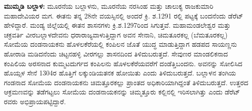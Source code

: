 \textbf{ ಮುಮ್ಮಡಿ ಬಲ್ಲಾಳ: } ಮೂರನೆಯ ಬಲ್ಲಾಳನು, ಮೂರನೆಯ ನರಸಿಂಹ ಮತ್ತು ಚಾಲುಕ್ಯ ರಾಜಕುಮಾರಿ ಮಹಾದೇವಿಯರ ಮಗ. ಈತನು ತನ್ನ 28ನೇ ವಯಸ್ಸಿನಲ್ಲಿ ಅಂದರೆ ಕ್ರಿ. ಶ.1291 ರಲ್ಲಿ ಪಟ್ಟಕ್ಕೆ ಬಂದನೆಂದು ಡೆರೆಟ್​ ಹೇಳಿದ್ದಾರೆ. ಮಂಡ್ಯ ಜಿಲ್ಲೆಯಲ್ಲಿ ಈತನ ಶಾಸನಗಳು ಕ್ರಿ.ಶ.1297ರಿಂದ ಸಿಗುತ್ತವೆ. ಮಹಾಮಂಡಲೇಶ್ವರ ಮತ್ತು ಚಕ್ರವರ್ತಿ ವೀರಬಲ್ಲಾಳದೇವನು ಧರಾರಾಜ್ಯವಾಳುತ್ತಿದ್ದಾಗ ಅವನ ಸೇನಾನಿ, ಚಿಮತೂರಕಲ್ಲ (ಬೆಮತೂರಕಲ್ಲ) ಸೋಮೆಯ ದಂಡನಾಯಕನು ಹೊಳಲಕೆರೆಯಲ್ಲಿ ಕಂಪಿಲನ ಜೊತೆ ಯುದ್ಧ ಮಾಡುತ್ತಿದ್ದಾಗ ಹಡಪದ ಸಾಯಣ್ಣನು ಹೋರಾಡಿ ಮಡಿದನೆಂದು ಚಿಟ್ಟನಹಳ್ಳಿ ವೀರಗಲ್ಲು ಶಾಸನದಿಂದ ತಿಳಿದುಬರುತ್ತದೆ. ಸೇವುಣರ ಮಾಂಡಲಿಕನಾದ ಕಂಪಿಲಿಯ ಅರಸನಾದ ಕುಮ್ಮಟದುರ್ಗದ ಕಂಪಿಲನು ಹೊಳಲಕೆರೆಯವರೆಗೆ ದಂಡೆತ್ತಿಬಂದನು. ಅವನನ್ನು ಸೋಲಿಸಿದ ಹೊಯ್ಸಳ ಸೇನೆ 1304ರ ಹೊತ್ತಿಗೆ ಲಕ್ಕುಂಡಿಯತನಕ ಹೋಯಿತು ಎಂದು ತಿಳಿದುಬರುತ್ತದೆ. ಬಲ್ಲಾಳನ ತಂಗಿಯ ಗಂಡನಾದ ಸೋಮೆಯ ದಂಡನಾಯಕನು ಚಿಮತ್ತೂರಕಲ್ಲು ಪ್ರಾಂತದ ಅಧಿಕಾರಿಯಾಗಿದ್ದಂತೆ ತಿಳಿದುಬರುತ್ತದೆ. ಉತ್ತರದ ಆಕ್ರಮಣವನ್ನು ತಡೆಗಟ್ಟಲು ಸೋಮೆಯ ದಂಡನಾಯಕನನ್ನು ಚಿಮ್ಮತ್ತೂರು ಕಲ್ಲಿನಲ್ಲಿ ಇರಿಸಲಾಗಿತ್ತು ಎಂದು ಡೆರೆಟ್​ರವರು ಅಭಿಪ್ರಾಯಪಟ್ಟಿದ್ದಾರೆ. 

\newpage


